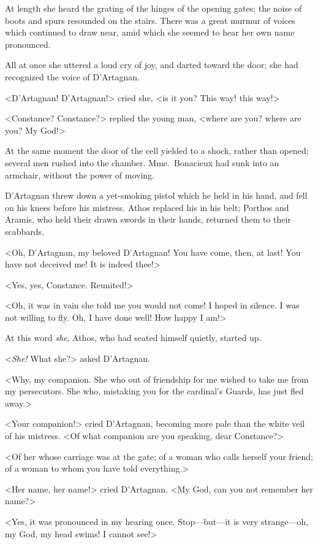 At length she heard the grating of the hinges of the opening gates; the noise of boots and spurs resounded on the stairs. There was a great murmur of voices which continued to draw near, amid which she seemed to hear her own name pronounced. 

All at once she uttered a loud cry of joy, and darted toward the door; she had recognized the voice of D'Artagnan. 

<D'Artagnan! D'Artagnan!> cried she, <is it you? This way! this way!> 

<Constance? Constance?> replied the young man, <where are you? where are you? My God!> 

At the same moment the door of the cell yielded to a shock, rather than opened; several men rushed into the chamber. Mme.~Bonacieux had sunk into an armchair, without the power of moving. 

D'Artagnan threw down a yet-smoking pistol which he held in his hand, and fell on his knees before his mistress. Athos replaced his in his belt; Porthos and Aramis, who held their drawn swords in their hands, returned them to their scabbards. 

<Oh, D'Artagnan, my beloved D'Artagnan! You have come, then, at last! You have not deceived me! It is indeed thee!> 

<Yes, yes, Constance. Reunited!> 

<Oh, it was in vain she told me you would not come! I hoped in silence. I was not willing to fly. Oh, I have done well! How happy I am!> 

At this word \emph{she}, Athos, who had seated himself quietly, started up. 

<\emph{She!} What she?> asked D'Artagnan. 

<Why, my companion. She who out of friendship for me wished to take me from my persecutors. She who, mistaking you for the cardinal's Guards, has just fled away.> 

<Your companion!> cried D'Artagnan, becoming more pale than the white veil of his mistress. <Of what companion are you speaking, dear Constance?> 

<Of her whose carriage was at the gate; of a woman who calls herself your friend; of a woman to whom you have told everything.> 

<Her name, her name!> cried D'Artagnan. <My God, can you not remember her name?> 

<Yes, it was pronounced in my hearing once. Stop—but—it is very strange—oh, my God, my head swims! I cannot see!> 

